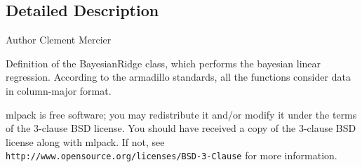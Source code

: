 \subsection{Detailed Description}
\begin{DoxyAuthor}{Author}
Clement Mercier
\end{DoxyAuthor}
Definition of the Bayesian\+Ridge class, which performs the bayesian linear regression. According to the armadillo standards, all the functions consider data in column-\/major format.

mlpack is free software; you may redistribute it and/or modify it under the terms of the 3-\/clause B\+SD license. You should have received a copy of the 3-\/clause B\+SD license along with mlpack. If not, see {\tt http\+://www.\+opensource.\+org/licenses/\+B\+S\+D-\/3-\/\+Clause} for more information. 